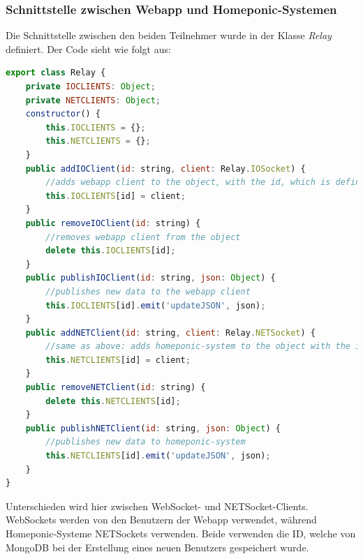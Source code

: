 \subsubsection{Schnittstelle zwischen Webapp und Homeponic-Systemen}
Die Schnittstelle zwischen den beiden Teilnehmer wurde in der Klasse \textit{Relay} definiert. Der Code sieht wie folgt aus:
\lstset{escapechar=?,style=customjava}
\begin{lstlisting}[language=javascript, caption=Kommunikation zwischen Webapp und Homeponic-System - Relay Klasse]
export class Relay {
    private IOCLIENTS: Object;
    private NETCLIENTS: Object;
    constructor() {
        this.IOCLIENTS = {};
        this.NETCLIENTS = {};
    }
    public addIOClient(id: string, client: Relay.IOSocket) {
        //adds webapp client to the object, with the id, which is defined from MongoDB
        this.IOCLIENTS[id] = client;
    }
    public removeIOClient(id: string) {
        //removes webapp client from the object
        delete this.IOCLIENTS[id];
    }
    public publishIOClient(id: string, json: Object) {
        //publishes new data to the webapp client
        this.IOCLIENTS[id].emit('updateJSON', json);
    }
    public addNETClient(id: string, client: Relay.NETSocket) {
        //same as above: adds homeponic-system to the object with the id defined from MongoDB 
        this.NETCLIENTS[id] = client;
    }
    public removeNETClient(id: string) {
        delete this.NETCLIENTS[id];
    }
    public publishNETClient(id: string, json: Object) {
        //publishes new data to homeponic-system
        this.NETCLIENTS[id].emit('updateJSON', json);
    }
}
\end{lstlisting}
\lstset{escapechar=@,style=customjava}
Unterschieden wird hier zwischen WebSocket- und NETSocket-Clients. WebSockets werden von den Benutzern der Webapp verwendet, während Homeponic-Systeme NETSockets verwenden. Beide verwenden die ID, welche von MongoDB bei der Erstellung eines neuen Benutzers gespeichert wurde.
\newpage
\blankpage